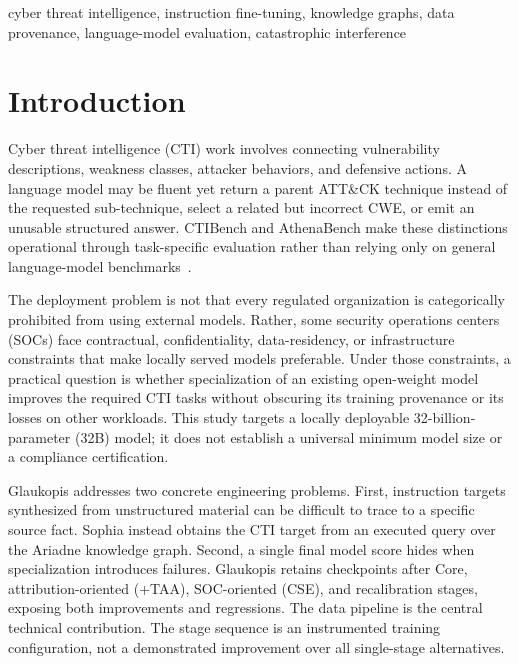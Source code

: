 \documentclass[journal]{IEEEtran}
\begin{document}
\begin{IEEEkeywords}
cyber threat intelligence, instruction fine-tuning, knowledge graphs, data provenance, language-model evaluation, catastrophic interference
\end{IEEEkeywords}
\begin{center}
\end{center}

\section{Introduction}\label{sec:intro}
Cyber threat intelligence (CTI) work involves connecting vulnerability descriptions, weakness classes, attacker behaviors, and defensive actions. A language model may be fluent yet return a parent ATT\&CK technique instead of the requested sub-technique, select a related but incorrect CWE, or emit an unusable structured answer. CTIBench and AthenaBench make these distinctions operational through task-specific evaluation rather than relying only on general language-model benchmarks~\cite{alam2024ctibench,alam2025athenabench}.

The deployment problem is not that every regulated organization is categorically prohibited from using external models. Rather, some security operations centers (SOCs) face contractual, confidentiality, data-residency, or infrastructure constraints that make locally served models preferable. Under those constraints, a practical question is whether specialization of an existing open-weight model improves the required CTI tasks without obscuring its training provenance or its losses on other workloads. This study targets a locally deployable 32-billion-parameter (32B) model; it does not establish a universal minimum model size or a compliance certification.

Glaukopis addresses two concrete engineering problems. First, instruction targets synthesized from unstructured material can be difficult to trace to a specific source fact. Sophia instead obtains the CTI target from an executed query over the Ariadne knowledge graph. Second, a single final model score hides when specialization introduces failures. Glaukopis retains checkpoints after Core, attribution-oriented (+TAA), SOC-oriented (CSE), and recalibration stages, exposing both improvements and regressions. The data pipeline is the central technical contribution. The stage sequence is an instrumented training configuration, not a demonstrated improvement over all single-stage alternatives.
\end{document}
